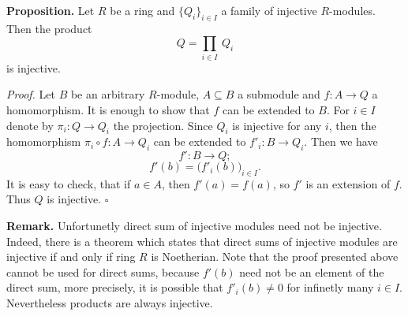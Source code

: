 \documentclass[12pt]{article}
\begin{document}
\textbf{Proposition.} Let $R$ be a ring and $\{Q_i\}_{i\in I}$ a family of injective $R$-modules. Then the product $$Q=\prod_{i\in I}\ Q_i$$ is injective.

\textit{Proof.} Let $B$ be an arbitrary $R$-module, $A\subseteq B$ a submodule and $f:A\to Q$ a homomorphism. It is enough to show that $f$ can be extended to $B$. For $i\in I$ denote by $\pi_i:Q\to Q_i$ the projection. Since $Q_i$ is injective for any $i$, then the homomorphism $\pi_i \circ f:A\to Q_i$ can be extended to $f'_i:B\to Q_i$. Then we have $$f':B\to Q;$$
$$f'(b)=\big( f'_i (b)\big)_{i\in I}.$$
It is easy to check, that if $a\in A$, then $f'(a)=f(a)$, so $f'$ is an extension of $f$. Thus $Q$ is injective. $\square$

\textbf{Remark.} Unfortunetly direct sum of injective modules need not be injective. Indeed, there is a theorem which states that direct sums of injective modules are injective if and only if ring $R$ is Noetherian. Note that the proof presented above cannot be used for direct sums, because $f'(b)$ need not be an element of the direct sum, more precisely, it is possible that $f'_i(b)\neq 0$ for infinetly many $i\in I$. Nevertheless products are always injective.
\end{document}
